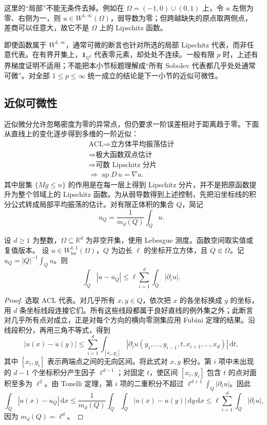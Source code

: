 这里的“局部”不能无条件去掉。例如在 \(\Omega=(-1,0)\cup(0,1)\) 上，令 \(u\) 左侧为零、右侧为一，则 \(u\in W^{1,\infty}(\Omega)\)，弱导数为零；但跨越缺失的原点取两侧点，差商可以任意大，故它不是 \(\Omega\) 上的 Lipschitz 函数。

\ProseParagraphBreak

即使函数属于 \(W^{1,\infty}\)，通常可微的断言也针对所选的局部 Lipschitz 代表，而非任意代表。在有界开集上，\(\mathbf1_{\mathbb Q^d}\) 代表零元素，却处处不连续。一般有限 \(p\) 时，上述有界梯度证明不适用；不能把本小节标题理解成“所有 Sobolev 代表都几乎处处通常可微”。对全部 \(1\leq p\leq\infty\) 统一成立的结论是下一小节的近似可微性。

\subsection{近似可微性}
\label{b1:subsec:210404}

近似微分允许忽略密度为零的异常点，但仍要求一阶误差相对于距离趋于零。下面从直线上的变化逐步得到多维的一阶近似：
\[
 \begin{gathered}
  \text{ACL}\Longrightarrow\text{立方体平均振荡估计}\\
  \Longrightarrow\text{极大函数双点估计}\\
  \Longrightarrow\text{可数 Lipschitz 分片}\\
  \Longrightarrow\operatorname{ap}D\,u=\nabla u.
 \end{gathered}
\]
其中层集 \(\{Mg\leq n\}\) 的作用是在每一层上得到 Lipschitz 分片，并不是把原函数提升为整个邻域上的 Lipschitz 函数。为从弱导数得到上述控制，先把沿坐标线的积分公式转成局部平均振荡的估计。对有限正体积的集合 \(Q\)，简记
\[
 u_Q=\dfrac1{m_d(Q)}\int_Q u.
\]

\begin{lemma}\label{b1:lem:sobolev-cube-oscillation}
设 \(d\geq1\) 为整数，\(\Omega\subseteq\mathbb R^d\) 为非空开集，使用 Lebesgue 测度。函数空间取实值或复值版本。
设 \(u\in W^{1,1}_{\mathrm{loc}}(\Omega)\)，\(Q\) 为边长 \(\ell\) 的坐标开立方体，且 \(\overline Q\Subset\Omega\)。记 \(u_Q=|Q|^{-1}\int_Q u\)。则
\begin{equation}\label{b1:eq:sobolev-cube-oscillation}
 \int_Q|u-u_Q|
 \leq\ell\sum_{i=1}^d\int_Q|\partial_i u|.
\end{equation}
\end{lemma}
\begin{proof}
选取 ACL 代表。对几乎所有 \(x,y\in Q\)，依次把 \(x\) 的各坐标换成 \(y\) 的坐标，用 \(d\) 条坐标线段连接它们。所有这些线段都属于良好直线的例外集之外；此断言对几乎所有点对成立，正是对每个方向的横向零测集应用 Fubini 定理的结果。沿线段积分，再用三角不等式，得到
\[
 |u(x)-u(y)|
 \leq\sum_{i=1}^d\int_{[x_i,y_i]}
 |\partial_i u(y_1,\ldots,y_{i-1},t,x_{i+1},\ldots,x_d)|\,\mathrm dt,
\]
其中 \([x_i,y_i]\) 表示两端点之间的无向区间。将此式对 \(x,y\) 积分。第 \(i\) 项中未出现的 \(d-1\) 个坐标积分产生因子 \(\ell^{d-1}\)；对固定 \(t\)，使区间 \([x_i,y_i]\) 包含 \(t\) 的点对面积至多为 \(\ell^2\)。由 Tonelli 定理，第 \(i\) 项的二重积分不超过 \(\ell^{d+1}\int_Q|\partial_i u|\)。因此
\[
 \int_Q|u(x)-u_Q|\,\mathrm dx
 \leq\dfrac1{m_d(Q)}\int_Q\int_Q|u(x)-u(y)|\,\mathrm dy\,\mathrm dx
 \leq\ell\sum_{i=1}^d\int_Q|\partial_i u|,
\]
因为 \(m_d(Q)=\ell^d\)。
\end{proof}

